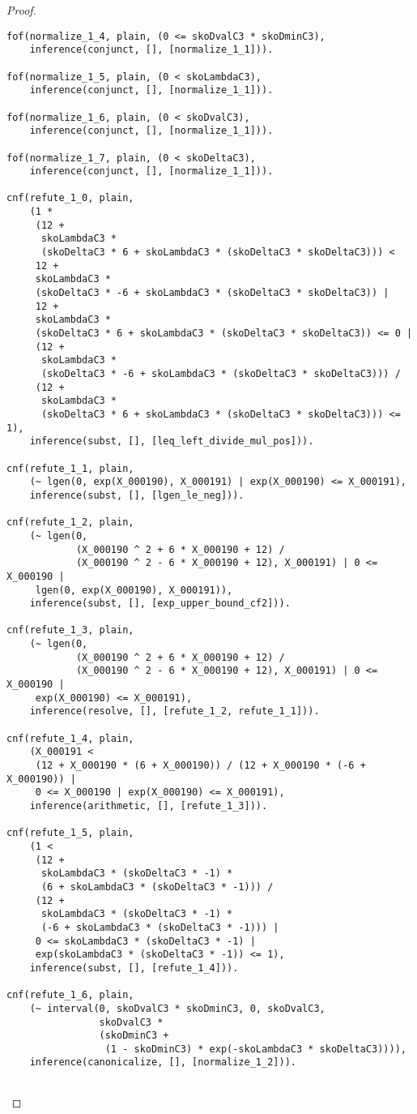 \begin{proof}
\begin{verbatim}
fof(normalize_1_4, plain, (0 <= skoDvalC3 * skoDminC3),
    inference(conjunct, [], [normalize_1_1])).

fof(normalize_1_5, plain, (0 < skoLambdaC3),
    inference(conjunct, [], [normalize_1_1])).

fof(normalize_1_6, plain, (0 < skoDvalC3),
    inference(conjunct, [], [normalize_1_1])).

fof(normalize_1_7, plain, (0 < skoDeltaC3),
    inference(conjunct, [], [normalize_1_1])).

cnf(refute_1_0, plain,
    (1 *
     (12 +
      skoLambdaC3 *
      (skoDeltaC3 * 6 + skoLambdaC3 * (skoDeltaC3 * skoDeltaC3))) <
     12 +
     skoLambdaC3 *
     (skoDeltaC3 * -6 + skoLambdaC3 * (skoDeltaC3 * skoDeltaC3)) |
     12 +
     skoLambdaC3 *
     (skoDeltaC3 * 6 + skoLambdaC3 * (skoDeltaC3 * skoDeltaC3)) <= 0 |
     (12 +
      skoLambdaC3 *
      (skoDeltaC3 * -6 + skoLambdaC3 * (skoDeltaC3 * skoDeltaC3))) /
     (12 +
      skoLambdaC3 *
      (skoDeltaC3 * 6 + skoLambdaC3 * (skoDeltaC3 * skoDeltaC3))) <= 1),
    inference(subst, [], [leq_left_divide_mul_pos])).

cnf(refute_1_1, plain,
    (~ lgen(0, exp(X_000190), X_000191) | exp(X_000190) <= X_000191),
    inference(subst, [], [lgen_le_neg])).

cnf(refute_1_2, plain,
    (~ lgen(0,
            (X_000190 ^ 2 + 6 * X_000190 + 12) /
            (X_000190 ^ 2 - 6 * X_000190 + 12), X_000191) | 0 <= X_000190 |
     lgen(0, exp(X_000190), X_000191)),
    inference(subst, [], [exp_upper_bound_cf2])).

cnf(refute_1_3, plain,
    (~ lgen(0,
            (X_000190 ^ 2 + 6 * X_000190 + 12) /
            (X_000190 ^ 2 - 6 * X_000190 + 12), X_000191) | 0 <= X_000190 |
     exp(X_000190) <= X_000191),
    inference(resolve, [], [refute_1_2, refute_1_1])).

cnf(refute_1_4, plain,
    (X_000191 <
     (12 + X_000190 * (6 + X_000190)) / (12 + X_000190 * (-6 + X_000190)) |
     0 <= X_000190 | exp(X_000190) <= X_000191),
    inference(arithmetic, [], [refute_1_3])).

cnf(refute_1_5, plain,
    (1 <
     (12 +
      skoLambdaC3 * (skoDeltaC3 * -1) *
      (6 + skoLambdaC3 * (skoDeltaC3 * -1))) /
     (12 +
      skoLambdaC3 * (skoDeltaC3 * -1) *
      (-6 + skoLambdaC3 * (skoDeltaC3 * -1))) |
     0 <= skoLambdaC3 * (skoDeltaC3 * -1) |
     exp(skoLambdaC3 * (skoDeltaC3 * -1)) <= 1),
    inference(subst, [], [refute_1_4])).

cnf(refute_1_6, plain,
    (~ interval(0, skoDvalC3 * skoDminC3, 0, skoDvalC3,
                skoDvalC3 *
                (skoDminC3 +
                 (1 - skoDminC3) * exp(-skoLambdaC3 * skoDeltaC3)))),
    inference(canonicalize, [], [normalize_1_2])).


\end{verbatim}
\end{proof}
